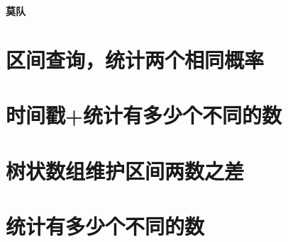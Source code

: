 \documentclass{article}
\begin{document}
\begin{titlepage}

\thispagestyle{empty}
\pagebreak
\textbf{莫队}
\pagestyle{plain}
\tableofcontents



\hspace{3em}
\section{﻿区间查询，统计两个相同概率}

\section{时间戳+统计有多少个不同的数}

\section{树状数组维护区间两数之差}

\section{统计有多少个不同的数}


\end{titlepage}
\end{document}
